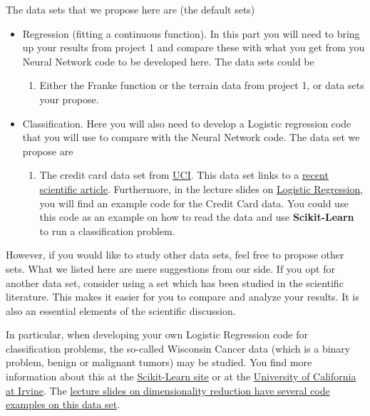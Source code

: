\documentclass[%
oneside,                 %
final,                   %
10pt]{article}
\begin{document}
The data sets that we propose here are (the default sets)

\begin{itemize}
\item Regression (fitting a continuous function). In this part you will need to bring up your results from project 1 and compare these with what you get from you Neural Network code to be developed here. The data sets could be
\begin{enumerate}

 \item Either the Franke function or the terrain data from project 1, or data sets your propose.

\end{enumerate}

\noindent
\item Classification. Here you will also need to develop a Logistic regression code that you will use to compare with the Neural Network code. The data set we propose are
\begin{enumerate}

 \item The credit card data set from \href{{https://archive.ics.uci.edu/ml/datasets/default+of+credit+card+clients}}{UCI}. This data set links to a \href{{https://bradzzz.gitbooks.io/ga-seattle-dsi/content/dsi/dsi_05_classification_databases/2.1-lesson/assets/datasets/DefaultCreditCardClients_yeh_2009.pdf}}{recent scientific article}.  Furthermore, in the lecture slides on \href{{https://compphysics.github.io/MachineLearning/doc/pub/LogReg/html/LogReg.html}}{Logistic Regression}, you will find an example code for the Credit Card data. You could use this code as an example on how to read the data and use \textbf{Scikit-Learn} to run a classification problem.  
\end{enumerate}

\noindent
\end{itemize}

\noindent
However, if you would like to study other data sets, feel free to
propose other sets. What we listed here are mere suggestions from our
side. If you opt for another data set, consider using a set which
has been studied in the scientific literature. This makes it easier
for you to compare and analyze your results. It is also an essential
elements of the scientific discussion.

In particular, when developing your own Logistic Regression code for classification problems, the so-called Wisconsin Cancer data (which is a binary problem, benign or malignant tumors) may be studied. You find more information about this at the \href{{https://scikit-learn.org/stable/modules/generated/sklearn.datasets.load_breast_cancer.html}}{Scikit-Learn site} or at the \href{{https://archive.ics.uci.edu/ml/datasets/breast+cancer+wisconsin+(original)}}{University of California at Irvine}. The \href{{https://compphysics.github.io/MachineLearning/doc/pub/DimRed/html/DimRed.html}}{lecture slides on dimensionality reduction have several code examples on this data set}.
\end{document}
